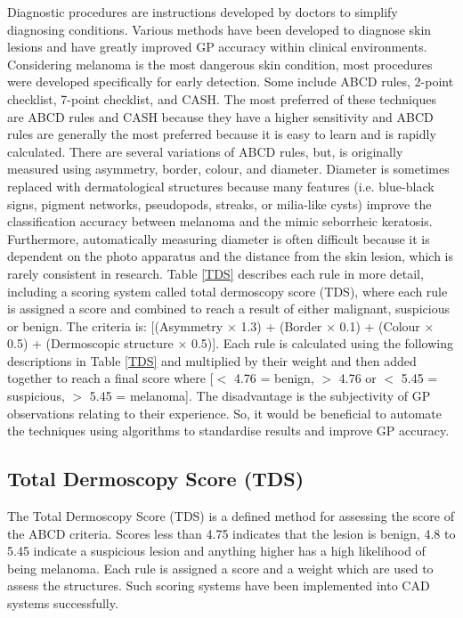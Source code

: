Diagnostic procedures are instructions developed by doctors to simplify diagnosing conditions. Various methods have been developed to diagnose skin lesions and have greatly improved GP accuracy within clinical environments\cite{Nachbar1994, unlu2014}. Considering melanoma is the most dangerous skin condition, most procedures were developed specifically for early detection. Some include ABCD rules, 2-point checklist, 7-point checklist, and CASH. The most preferred of these techniques are ABCD rules and CASH because they have a higher sensitivity\cite{unlu2014} and ABCD rules are generally the most preferred because it is easy to learn and is rapidly calculated\cite{Nachbar1994}. There are several variations of ABCD rules, but, is originally measured using asymmetry, border, colour, and diameter. Diameter is sometimes replaced with dermatological structures because many features (i.e. blue-black signs, pigment networks, pseudopods, streaks, or milia-like cysts\cite{Stricklin2011}) improve the classification accuracy between melanoma and the mimic seborrheic keratosis\cite{Cognetta1994}. Furthermore, automatically measuring diameter is often difficult because it is dependent on the photo apparatus and the distance from the skin lesion, which is rarely consistent in research. Table \ref{TDS} describes each rule in more detail, including a scoring system called total dermoscopy score (TDS), where each rule is assigned a score and combined to reach a result of either malignant, suspicious or benign. The criteria is: [(Asymmetry $\times$ 1.3) + (Border $\times$ 0.1) + (Colour $\times$ 0.5) + (Dermoscopic structure $\times$ 0.5)]. Each rule is calculated using the following descriptions in Table \ref{TDS} and multiplied by their weight and then added together to reach a final score where [$<$ 4.76 = benign, $>$ 4.76 or $<$ 5.45 = suspicious, $>$ 5.45 = melanoma]. The disadvantage is the subjectivity of GP observations relating to their experience. So, it would be beneficial to automate the techniques using algorithms to standardise results and improve GP accuracy.

\subsection{Total Dermoscopy Score (TDS)}
The Total Dermoscopy Score (TDS) is a defined method for assessing the score of the ABCD criteria. Scores less than 4.75 indicates that the lesion is benign, 4.8 to 5.45 indicate a suspicious lesion and anything higher has a high likelihood of being melanoma. Each rule is assigned a score and a weight which are used to assess the structures. Such scoring systems have been implemented into CAD systems successfully\cite{Jaworek-Korjakowska2012}.

